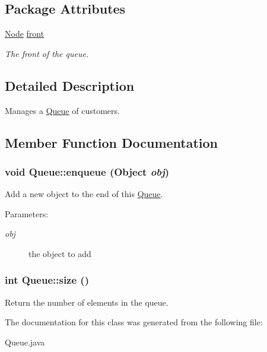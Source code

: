 \subsection*{Package Attributes}
\begin{CompactItemize}
\item 
\hypertarget{class_queue_1a450bfcd2815ae929ad6d45110f6755}{
\hyperlink{class_node}{Node} \hyperlink{class_queue_1a450bfcd2815ae929ad6d45110f6755}{front}}
\label{class_queue_1a450bfcd2815ae929ad6d45110f6755}

\begin{CompactList}\small\item\em The front of the queue. \item\end{CompactList}\end{CompactItemize}


\subsection{Detailed Description}
Manages a \hyperlink{class_queue}{Queue} of customers. 

\subsection{Member Function Documentation}
\hypertarget{class_queue_f307abf6ecbc2033ca3273335cddf0bf}{
\subsubsection[{enqueue}]{\setlength{\rightskip}{0pt plus 5cm}void Queue::enqueue (Object {\em obj})}}
\label{class_queue_f307abf6ecbc2033ca3273335cddf0bf}


Add a new object to the end of this \hyperlink{class_queue}{Queue}. 

\begin{Desc}
\item[Parameters:]
\begin{description}
\item[{\em obj}]the object to add \end{description}
\end{Desc}
\hypertarget{class_queue_04035df1270c73e08ca1fa7eb267d9b8}{
\subsubsection[{size}]{\setlength{\rightskip}{0pt plus 5cm}int Queue::size ()}}
\label{class_queue_04035df1270c73e08ca1fa7eb267d9b8}


Return the number of elements in the queue. 



The documentation for this class was generated from the following file:\begin{CompactItemize}
\item 
Queue.java\end{CompactItemize}
